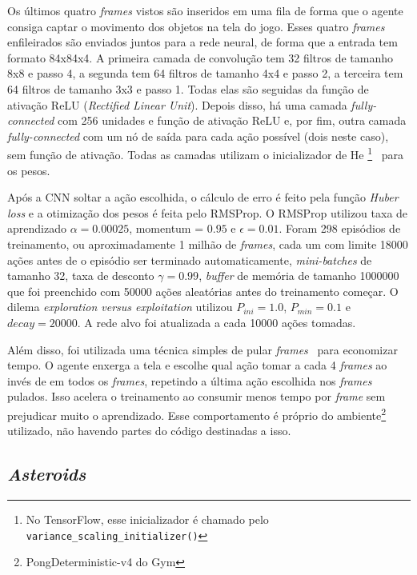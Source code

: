 Os últimos quatro \textit{frames} vistos são inseridos em uma fila de forma que o agente consiga captar o movimento dos objetos na tela do jogo.
Esses quatro \textit{frames} enfileirados são enviados juntos para a rede neural, de forma que a entrada tem formato 84x84x4.
A primeira camada de convolução tem 32 filtros de tamanho 8x8 e passo 4, a segunda tem 64 filtros de tamanho 4x4 e passo 2, a terceira tem 64 filtros de tamanho 3x3 e passo 1.
Todas elas são seguidas da função de ativação ReLU (\textit{Rectified Linear Unit}).
Depois disso, há uma camada \textit{fully-connected} com 256 unidades e função de ativação ReLU e, por fim, outra camada \textit{fully-connected} com um nó de saída para cada ação possível (dois neste caso), sem função de ativação.
Todas as camadas utilizam o inicializador de He \footnote{No TensorFlow, esse inicializador é chamado pelo \texttt{variance\_scaling\_initializer()}}~\cite{DBLP:journals/corr/HeZR015} para os pesos.

Após a CNN soltar a ação escolhida, o cálculo de erro é feito pela função \textit{Huber loss} e a otimização dos pesos é feita pelo RMSProp.
O RMSProp utilizou taxa de aprendizado $\alpha = 0.00025$, momentum = $0.95$ e $\epsilon = 0.01$.
Foram 298 episódios de treinamento, ou aproximadamente 1 milhão de \textit{frames}, cada um com limite 18000 ações antes de o episódio ser terminado automaticamente, \textit{mini-batches} de tamanho 32, taxa de desconto $\gamma = 0.99$, \textit{buffer} de memória de tamanho 1000000 que foi preenchido com 50000 ações aleatórias antes do treinamento começar.
O dilema \textit{exploration versus exploitation} utilizou $P_{ini} = 1.0$, $P_{min} = 0.1$ e $decay = 20000$.
A rede alvo foi atualizada a cada 10000 ações tomadas.

Além disso, foi utilizada uma técnica simples de pular \textit{frames}~\cite{DBLP:journals/corr/abs-1207-4708} para economizar tempo.
O agente enxerga a tela e escolhe qual ação tomar a cada 4 \textit{frames} ao invés de em todos os \textit{frames}, repetindo a última ação escolhida nos \textit{frames} pulados.
Isso acelera o treinamento ao consumir menos tempo por \textit{frame} sem prejudicar muito o aprendizado.
Esse comportamento é próprio do ambiente\footnote{PongDeterministic-v4 do Gym} utilizado, não havendo partes do código destinadas a isso.

\subsection{\textit{Asteroids}}
\label{sec:arq_asteroids}

